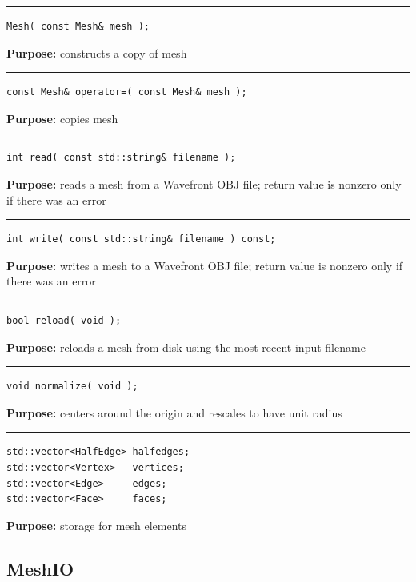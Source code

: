 \documentclass{article}
\begin{document}
\hspace{-.21in}\rule{5in}{1pt}
\begin{verbatim}
Mesh( const Mesh& mesh );
\end{verbatim}
\textbf{Purpose:}
constructs a copy of mesh

\hspace{-.21in}\rule{5in}{1pt}
\begin{verbatim}
const Mesh& operator=( const Mesh& mesh );
\end{verbatim}
\textbf{Purpose:}
copies mesh

\hspace{-.21in}\rule{5in}{1pt}
\begin{verbatim}
int read( const std::string& filename );
\end{verbatim}
\textbf{Purpose:}
reads a mesh from a Wavefront OBJ file; return value is nonzero
only if there was an error

\hspace{-.21in}\rule{5in}{1pt}
\begin{verbatim}
int write( const std::string& filename ) const;
\end{verbatim}
\textbf{Purpose:}
writes a mesh to a Wavefront OBJ file; return value is nonzero
only if there was an error

\hspace{-.21in}\rule{5in}{1pt}
\begin{verbatim}
bool reload( void );
\end{verbatim}
\textbf{Purpose:}
reloads a mesh from disk using the most recent input filename

\hspace{-.21in}\rule{5in}{1pt}
\begin{verbatim}
void normalize( void );
\end{verbatim}
\textbf{Purpose:}
centers around the origin and rescales to have unit radius

\hspace{-.21in}\rule{5in}{1pt}
\begin{verbatim}
std::vector<HalfEdge> halfedges;
std::vector<Vertex>   vertices;
std::vector<Edge>     edges;
std::vector<Face>     faces;
\end{verbatim}
\textbf{Purpose:}
storage for mesh elements

\pagebreak\subsection{MeshIO}
\end{document}
